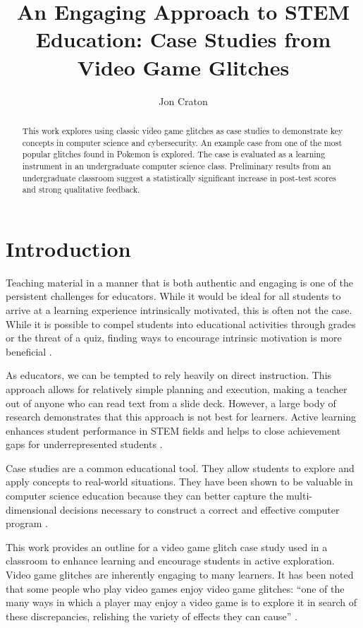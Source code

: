 \documentclass[letterpaper]{article}
\title{An Engaging Approach to STEM Education: Case Studies from Video Game Glitches}
\author[1]{Jon Craton}
\affil[1]{Anderson University, Anderson, IN}
\date{} %
\begin{document}
\maketitle

\begin{abstract}
This work explores using classic video game glitches as case studies to demonstrate key concepts in computer science and cybersecurity. An example case from one of the most popular glitches found in Pokemon is explored. The case is evaluated as a learning instrument in an undergraduate computer science class. Preliminary results from an undergraduate classroom suggest a statistically significant increase in post-test scores and strong qualitative feedback.
\end{abstract}

\section{Introduction}
Teaching material in a manner that is both authentic and engaging is one of the persistent challenges for educators. While it would be ideal for all students to arrive at a learning experience intrinsically motivated, this is often not the case. While it is possible to compel students into educational activities through grades or the threat of a quiz, finding ways to encourage intrinsic motivation is more beneficial \cite{deci2013intrinsic}.

As educators, we can be tempted to rely heavily on direct instruction. This approach allows for relatively simple planning and execution, making a teacher out of anyone who can read text from a slide deck. However, a large body of research demonstrates that this approach is not best for learners. Active learning enhances student performance in STEM fields \cite{freeman2014active} and helps to close achievement gaps for underrepresented students \cite{theobald2020active}.

Case studies are a common educational tool. They allow students to explore and apply concepts to real-world situations. They have been shown to be valuable in computer science education because they can better capture the multi-dimensional decisions necessary to construct a correct and effective computer program \cite{linn1992case}.

This work provides an outline for a video game glitch case study used in a classroom to enhance learning and encourage students in active exploration. Video game glitches are inherently engaging to many learners. It has been noted that some people who play video games enjoy video game glitches: ``one of the many ways in which a player may enjoy a video game is to explore it in search of these discrepancies, relishing the variety of effects they can cause'' \cite{bainbridge2007creative}.
\end{document}
